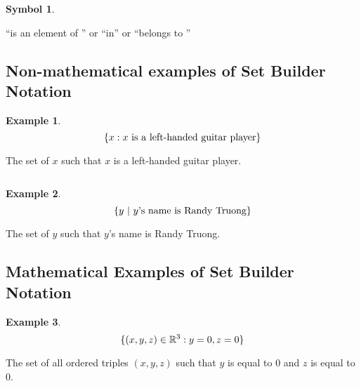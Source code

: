 \documentclass{report}
\newtheorem*{remark*}{Example}
\newtheorem{plain}{Symbol}
\begin{document}
\begin{sloppypar}
\begin{center}
{{\begin{plain}
      \end{plain}
      \begin{definition*}
                ``is an element of '' or ``in'' or ``belongs to ''
      \end{definition*}

    }
  }
\end{center}

\begin{center}

\end{center}

\subsection{Non-mathematical examples of Set Builder Notation}


\begin{remark*}
  \[ \{ x : \textrm{$ x $ is a left-handed guitar player} \}\]
\end{remark*}
\begin{definition*}
  The set of $ x $ such that $ x $ is a left-handed guitar
  player.
\end{definition*}
\[ \]
\begin{remark*}
  \[ \{ y ~|~ \textrm{$ y $'s name is Randy Truong} \}\]
\end{remark*}

\begin{definition*}
  The set of $ y $ such that $ y $'s name is Randy Truong.
\end{definition*}

\subsection{Mathematical Examples of Set Builder Notation}
\begin{remark*}
  \[ \{ (x, y, z) \in \mathbb{R}^{3} : y=0, z=0 \}\]
\end{remark*}
\begin{definition*}
  The set of all ordered triples $ (x, y, z)$ such that
  $ y $ is equal to $ 0 $ and $ z $ is equal to $ 0 $.
\end{definition*}


\end{sloppypar}
\end{document}

